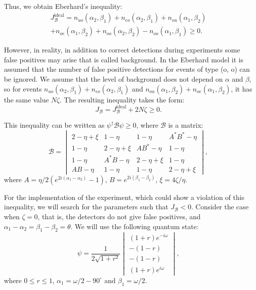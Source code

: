\documentclass[%
master,         %
subf,           %
href,           %
colorlinks=true %
]{disser}
\numberwithin{equation}{section}
\numberwithin{figure}{section}
\begin{document}
Thus, we obtain Eberhard's inequality:
\begin{multline*}
J_{\mathcal{B}}^{\mbox{ideal}} = n_{uo}(\alpha_2, \beta_1) + n_{eo}(\alpha_2, \beta_1) + n_{ou}(\alpha_1, \beta_2) \\
+ n_{oe}(\alpha_1, \beta_2) + n_{oo}(\alpha_2, \beta_2) - n_{oo}(\alpha_1, \beta_1) \geq 0.
\end{multline*}

However, in reality, in addition to correct detections during experiments some false positives may arise that is called background. In the Eberhard model it is assumed that the number of false positive detections for events of type (o, o) can be ignored. We assume that the level of background does not depend on $\alpha$ and $\beta$, so for events $n_{uo}(\alpha_2, \beta_1) + n_{eo}(\alpha_2, \beta_1)$ and $n_{ou}(\alpha_1, \beta_2) + n_{oe}(\alpha_1, \beta_2)$, it has the same value $N\zeta$. The resulting inequality takes the form:
\[
J_{\mathcal{B}} = J_{\mathcal{B}}^{\mbox{ideal}} + 2N\zeta \geq 0.
\]

This inequality can be written as $\psi^\dagger\mathcal{B}\psi \geq 0$, where $\mathcal{B}$ is a matrix:
\[
\mathcal{B} = 
\begin{vmatrix}
2 - \eta + \xi & 1 - \eta & 1 - \eta & A^*B^* - \eta\\
1 - \eta & 2 - \eta + \xi & AB^* - \eta & 1 - \eta\\
1 - \eta & A^*B - \eta & 2 - \eta + \xi & 1 - \eta\\
AB - \eta & 1 - \eta & 1 - \eta & 2 - \eta + \xi
\end{vmatrix},
\]
where $A = \eta/2(e^{2i(\alpha_1-\alpha_2)} - 1)$, $B = e^{2i(\beta_1 - \beta_2)}$, $\xi = 4\zeta/\eta$.

For the implementation of the experiment, which could show a violation of this inequality, we will search for the parameters such that $J_{\mathcal{B}} < 0$. Consider the case when $\zeta = 0$, that is, the detectors do not give false positives, and $\alpha_1 - \alpha_2 = \beta_1 - \beta_2 = \theta$. We will use the following quantum state:
\[
\psi = \frac{1}{2\sqrt{1 + r^2}}
\begin{vmatrix}
(1+r)e^{-i\omega}\\
-(1 - r)\\
-(1 - r)\\
(1 + r)e^{i\omega}
\end{vmatrix},
\]
where $0 \leq r \leq 1$, $\alpha_1 = \omega / 2 - 90^\circ$ and $\beta_1 = \omega / 2$.
\end{document}
